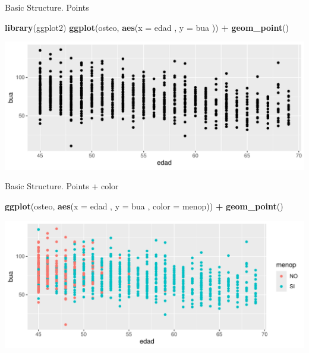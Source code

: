 \documentclass[
  ignorenonframetext,
]{beamer}
\newenvironment{Shaded}{\begin{snugshade}}{\end{snugshade}}
\newcommand{\AttributeTok}[1]{\textcolor[rgb]{0.13,0.29,0.53}{#1}}
\newcommand{\FunctionTok}[1]{\textcolor[rgb]{0.13,0.29,0.53}{\textbf{#1}}}
\newcommand{\NormalTok}[1]{#1}
\newcommand{\SpecialCharTok}[1]{\textcolor[rgb]{0.81,0.36,0.00}{\textbf{#1}}}
\begin{document}
\begin{frame}[fragile]{Basic Structure. Points}
\label{basic-structure.-points}
\begin{Shaded}
\begin{Highlighting}[]
\FunctionTok{library}\NormalTok{(ggplot2)}
\FunctionTok{ggplot}\NormalTok{(osteo, }\FunctionTok{aes}\NormalTok{(}\AttributeTok{x =}\NormalTok{ edad , }\AttributeTok{y =}\NormalTok{ bua )) }\SpecialCharTok{+} 
  \FunctionTok{geom\_point}\NormalTok{()}
\end{Highlighting}
\end{Shaded}

\includegraphics{StatisticsWithR-3-Exploratory_Analysis_II_And_Graphics_files/figure-beamer/unnamed-chunk-4-1.pdf}
\end{frame}

\begin{frame}[fragile]{Basic Structure. Points + color}
\label{basic-structure.-points-color}
\begin{Shaded}
\begin{Highlighting}[]
\FunctionTok{ggplot}\NormalTok{(osteo, }\FunctionTok{aes}\NormalTok{(}\AttributeTok{x =}\NormalTok{ edad , }\AttributeTok{y =}\NormalTok{ bua   , }\AttributeTok{color =}\NormalTok{ menop)) }\SpecialCharTok{+} 
  \FunctionTok{geom\_point}\NormalTok{()}
\end{Highlighting}
\end{Shaded}

\includegraphics{StatisticsWithR-3-Exploratory_Analysis_II_And_Graphics_files/figure-beamer/unnamed-chunk-5-1.pdf}
\end{frame}
\end{document}
